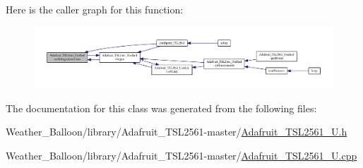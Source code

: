 Here is the caller graph for this function\+:
\nopagebreak
\begin{figure}[H]
\begin{center}
\leavevmode
\includegraphics[width=350pt]{class_adafruit___t_s_l2561___unified_a594636810e6e26dc025b7f1b7a16024f_icgraph}
\end{center}
\end{figure}




The documentation for this class was generated from the following files\+:\begin{DoxyCompactItemize}
\item 
Weather\+\_\+\+Balloon/library/\+Adafruit\+\_\+\+T\+S\+L2561-\/master/\hyperlink{_adafruit___t_s_l2561___u_8h}{Adafruit\+\_\+\+T\+S\+L2561\+\_\+\+U.\+h}\item 
Weather\+\_\+\+Balloon/library/\+Adafruit\+\_\+\+T\+S\+L2561-\/master/\hyperlink{_adafruit___t_s_l2561___u_8cpp}{Adafruit\+\_\+\+T\+S\+L2561\+\_\+\+U.\+cpp}\end{DoxyCompactItemize}
